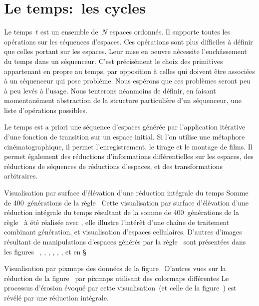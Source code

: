 \section{Le temps:~les cycles}

Le temps~$t$ est un ensemble de~$N$ espaces ordonnés. %
Il supporte toutes les opérations sur les séquences d'espaces. %
Ces opérations sont plus difficiles à définir que celles portant sur
les espaces. %
Leur mise en oeuvre nécessite l'enchâssement du temps dans un
séquenceur. %
C'est précisément le choix des primitives appartenant en propre au
temps, par opposition à celles qui doivent être associées à un
séquenceur qui pose problème. %
Nous espérons que ces problèmes seront peu à peu levés à l'usage. %
Nous tenterons néanmoins de définir, en faisant momentanément
abstraction de la structure particulière d'un séquenceur, une liste
d'opérations possibles. %

Le temps est a priori une séquence d'espaces générée par l'application
itérative d'une fonction de transition sur un espace initial. %
Si l'on utilise une métaphore cinématographique, il permet
l'enregistrement, le tirage et le montage de films. %
Il permet également des réductions d'informations différentielles sur
les espaces, des réductions de séquences de réductions d'espaces, et
des transformations arbitraires. %

%
{Visualisation par surface d'élévation d'une réduction intégrale du temps}%
{Somme de 400~générations de la règle~}%
{Cette visualisation par surface d'élévation d'une réduction intégrale
  du temps résultant de la somme de 400~générations de la
  règle~ à été réalisée avec , elle
  illustre l'intérêt d'une chaîne de traitement combinant génération,
   et visualisation d'espaces cellulaires. %
  D'autres d'images résultant de manipulations d'espaces générés par la
  règle~ sont présentées dans les figures~%
  , %
  , %
  , %
  , %
  , %
  , %
   et en \S{}~}

%
{Visualisation par pixmaps des données de la figure~\protect{}}%
{D'autres  vues sur la réduction de la
  figure~ par pixmaps utilisant des colormaps
  différentes}%
{Le processus d'érosion évoqué par cette visualisation~(et celle de la
  figure~) est révélé par une réduction intégrale.}

